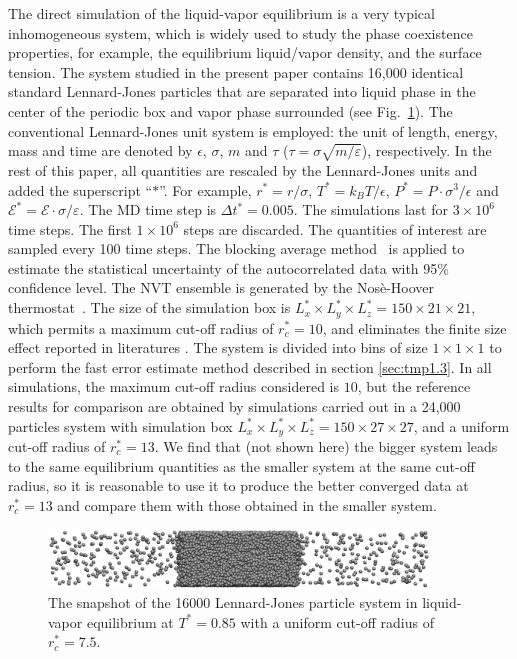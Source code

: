 \documentclass[preprint]{revtex4}
\begin{document}
The direct simulation of the liquid-vapor equilibrium is a very
typical inhomogeneous system, which is widely used to study the phase
coexistence properties, for example, the equilibrium liquid/vapor
density, and the surface tension. The system studied in the present
paper contains 16,000 identical standard Lennard-Jones particles that are
separated into liquid phase in the center of the periodic box and vapor phase
surrounded (see Fig.~\ref{fig:tmp1}).  The conventional Lennard-Jones
unit system is employed: the unit of length, energy, mass and time are
denoted by $\epsilon$, $\sigma$, $m$ and $\tau$ ($\tau =
\sigma\sqrt{m/\varepsilon}$), respectively.  In the rest of this paper,
all quantities are
rescaled by the Lennard-Jones units and added the superscript ``$\ast$''.
For example, $r^\ast = r / \sigma$, $T^\ast = k_BT / \epsilon$,
$P^\ast = P\cdot \sigma^3 / \epsilon$ and $\mathcal E^\ast = \mathcal
E\cdot\sigma/\varepsilon$.  The MD time step {is} $\Delta t^\ast =
0.005$. The simulations last for $3\times 10^6$ time steps. The first
$1\times 10^6$ steps are discarded. The quantities of interest are
sampled every 100 time steps. The blocking average
method~\cite{flyvbjerg1989error} is applied to estimate the
statistical uncertainty of the autocorrelated data with 95\%
confidence level. The NVT ensemble is generated by the Nos\`e-Hoover
thermostat~\cite{nose1984molecular, hoover1985canonical}.  The size of
the simulation box is $L_x^\ast \times L_y^\ast \times L_z^\ast =
150\times 21\times 21$, which permits a maximum cut-off radius of
$r_c^\ast = 10$, and eliminates the finite size effect reported in
literatures \cite{chen1995area, orea2005oscillatory,
  biscay2009calculation}.
The system is divided into bins of size $1\times1\times1$ to perform the fast error
estimate method described in section \ref{sec:tmp1.3}.
In all simulations, the maximum cut-off
radius considered is $10$, but the reference results for comparison
are obtained by simulations carried out in a 24,000 particles system
with simulation box $L_x^\ast \times L_y^\ast \times L_z^\ast =
150\times 27\times 27$, and a uniform cut-off radius of $r_c^\ast =
13$.  {We find that (not shown here)
  the bigger system leads to the same equilibrium
  quantities as the smaller system at the same cut-off radius, so
  it is reasonable to
  use it to produce the better converged data at $r_c^\ast=13$ and compare them with
  those obtained in the smaller system.
}

\begin{figure}
  \centering
  \includegraphics[width=0.9\textwidth]{figs/confout.eps}
  \caption{The snapshot of the 16000 Lennard-Jones particle system in
    liquid-vapor equilibrium at $T^\ast=0.85$ with a uniform cut-off
    radius of $r_c^\ast = 7.5$.}
  \label{fig:tmp1}
\end{figure}
\end{document}
